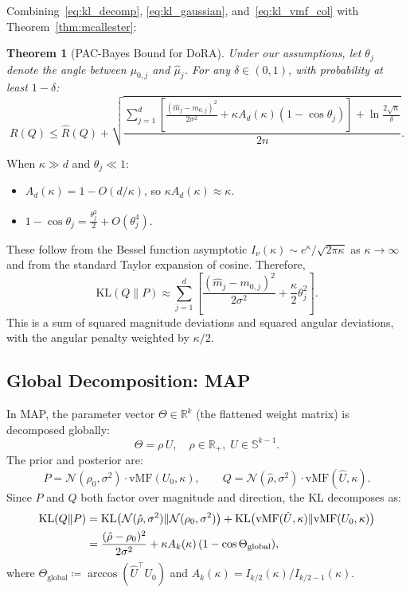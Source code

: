 \documentclass[11pt]{article}
\newtheorem{theorem}{Theorem}[section]
\newcommand{\KL}{\mathrm{KL}}
\newcommand{\vMF}{\mathrm{vMF}}
\newcommand{\Ad}{A_d}
\newcommand{\Ak}{A_k}
\newcommand{\Sk}{\mathbb{S}^{k-1}}
\newcommand{\R}{\mathbb{R}}
\begin{document}
Combining~\eqref{eq:kl_decomp}, \eqref{eq:kl_gaussian},
and~\eqref{eq:kl_vmf_col} with Theorem~\ref{thm:mcallester}:

\begin{theorem}[PAC-Bayes Bound for DoRA]
\label{thm:pac_dora}
Under our assumptions, let $\theta_j$ denote the angle between
$\mu_{0,j}$ and $\hat{\mu}_j$.
For any $\delta \in (0,1)$, with probability at least $1 - \delta$:
\[
  R(Q) \leq \hat{R}(Q) + \sqrt{
  \frac{\displaystyle\sum_{j=1}^d
    \left[\frac{(\hat{m}_j - m_{0,j})^2}{2\sigma^2}
    + \kappa \Ad(\kappa)(1 - \cos\theta_j)\right]
    + \ln\frac{2\sqrt{n}}{\delta}}{2n}}.
\]
\end{theorem}

When $\kappa \gg d$ and $\theta_j \ll 1$:
\begin{itemize}
  \item $\Ad(\kappa) = 1 - O(d/\kappa)$, so $\kappa\Ad(\kappa) \approx \kappa$.
  \item $1 - \cos\theta_j = \tfrac{\theta_j^2}{2} + O(\theta_j^4)$.
\end{itemize}
These follow from the Bessel function asymptotic $I_\nu(\kappa) \sim
e^\kappa / \sqrt{2\pi\kappa}$ as $\kappa \to \infty$ and from the
standard Taylor expansion of cosine. Therefore,
\begin{equation}
  \KL(Q \| P) \approx \sum_{j=1}^d
  \left[\frac{(\hat{m}_j - m_{0,j})^2}{2\sigma^2}
  + \frac{\kappa}{2}\theta_j^2\right].
\label{eq:kl_highconc_dora}
\end{equation}
This is a sum of squared magnitude deviations and squared angular
deviations, with the angular penalty weighted by $\kappa/2$.

\subsection{Global Decomposition: MAP}
\label{sec:map}

In MAP, the parameter vector $\Theta \in \R^k$ (the flattened weight
matrix) is decomposed globally:
\[
  \Theta = \rho\, U, \quad \rho \in \R_+,\; U \in \Sk.
\]
The prior and posterior are:
\[
  P = \mathcal{N}(\rho_0, \sigma^2)\cdot\vMF(U_0, \kappa),
  \qquad
  Q = \mathcal{N}(\hat\rho, \sigma^2)\cdot\vMF(\hat{U}, \kappa).
\]
Since $P$ and $Q$ both factor over magnitude and direction, the KL
decomposes as:
\begin{align}
  \KL(Q \| P)
  &= \KL\bigl(\mathcal{N}(\hat\rho,\sigma^2) \| \mathcal{N}(\rho_0,\sigma^2)\bigr)
   + \KL\bigl(\vMF(\hat{U},\kappa) \| \vMF(U_0,\kappa)\bigr) \notag\\
  &= \frac{(\hat\rho - \rho_0)^2}{2\sigma^2}
   + \kappa \Ak(\kappa)\,(1 - \cos\Theta_{\mathrm{global}}),
\label{eq:kl_map}
\end{align}
where $\Theta_{\mathrm{global}} \coloneqq \arccos(\hat{U}^\top U_0)$ and
$\Ak(\kappa) = I_{k/2}(\kappa)/I_{k/2-1}(\kappa)$.
\end{document}
